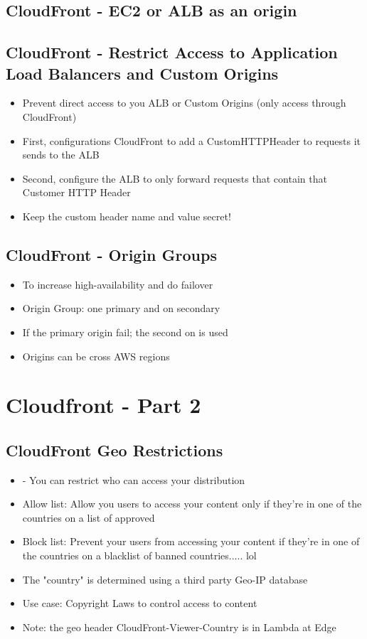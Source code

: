 \subsection{CloudFront - EC2 or ALB as an origin}

\subsection{CloudFront - Restrict Access to Application Load Balancers and Custom Origins}
\begin{itemize}
    \item Prevent direct access to you ALB or Custom Origins (only access through CloudFront)
    \item First, configurations CloudFront to add a CustomHTTPHeader to requests it sends to the ALB
    \item Second, configure the ALB to only forward requests that contain that Customer HTTP Header
    \item Keep the custom header name and value secret!
\end{itemize}

\subsection{CloudFront - Origin Groups}
\begin{itemize}
    \item To increase high-availability and do failover
    \item Origin Group: one primary and on secondary
    \item If the primary origin fail; the second on is used
    \item Origins can be cross AWS regions
\end{itemize}



\section{Cloudfront - Part 2}

\subsection{CloudFront Geo Restrictions}
\begin{itemize}
    \item - You can restrict who can access your distribution
    \item Allow list: Allow you users to access your content only if they're in one of the countries on a list of approved
    \item Block list: Prevent your users from accessing your content if they're in one of the countries on a blacklist of banned countries..... lol
    \item The "country" is determined using a third party Geo-IP database
    \item Use case: Copyright Laws to control access to content
    \item Note: the geo header CloudFront-Viewer-Country is in Lambda at Edge
\end{itemize}

